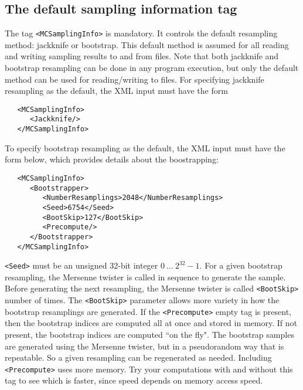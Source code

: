 \documentclass[12pt]{article}
\newcommand{\vb}{\texttt}
\begin{document}
\subsection{The default sampling information tag}
The tag \vb{<MCSamplingInfo>} is mandatory.  It controls the default
resampling method:  jackknife or bootstrap.  This default method    
is assumed for all reading and writing sampling results to and      
from files.  Note that both jackknife and bootstrap resampling      
can be done in any program execution, but only the default method can be used      
for reading/writing to files.  For specifying jackknife resampling as
the default, the XML input must have the form
\begin{verbatim}
   <MCSamplingInfo>
      <Jackknife/>
   </MCSamplingInfo>
\end{verbatim}
To specify bootstrap resampling as the default, the XML input must have the
form below, which provides details about the boostrapping:
\begin{verbatim}
   <MCSamplingInfo> 
      <Bootstrapper>
         <NumberResamplings>2048</NumberResamplings>
         <Seed>6754</Seed> 
         <BootSkip>127</BootSkip>
         <Precompute/> 
      </Bootstrapper>
   </MCSamplingInfo> 
\end{verbatim}
\vb{<Seed>} must be an unsigned 32-bit integer $0\ \dots\ 2^{32}-1$.
For a given bootstrap resampling, the Mersenne twister is
called in sequence to generate the sample. Before generating
the next resampling, the Mersenne twister is called \vb{<BootSkip>}
number of times. The \vb{<BootSkip>} parameter allows more variety
in how the bootstrap resamplings are generated. If the \vb{<Precompute>} 
empty tag is present, then the bootstrap indices are computed all at once 
and stored in memory. If not present, the bootstrap indices are computed 
``on the fly". The bootstrap samples are generated using the Mersenne
twister, but in a pseudorandom way that is repeatable. So a given resampling 
can be regenerated as needed. Including \vb{<Precompute>} uses more memory.
Try your computations with and without this tag to see which is faster, 
since speed depends on memory access speed.
\end{document}
